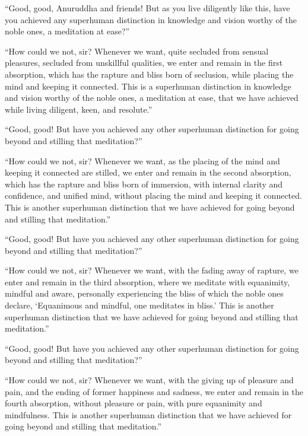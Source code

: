 \documentclass[12pt,openany]{book}%
\begin{document}
“Good, good, Anuruddha and friends! But as you live diligently like this, have you achieved any superhuman distinction in knowledge and vision worthy of the noble ones, a meditation at ease?” 

“How could we not, sir? Whenever we want, quite secluded from sensual pleasures, secluded from unskillful qualities, we enter and remain in the first absorption, which has the rapture and bliss born of seclusion, while placing the mind and keeping it connected. This is a superhuman distinction in knowledge and vision worthy of the noble ones, a meditation at ease, that we have achieved while living diligent, keen, and resolute.” 

“Good, good! But have you achieved any other superhuman distinction for going beyond and stilling that meditation?” 

“How could we not, sir? Whenever we want, as the placing of the mind and keeping it connected are stilled, we enter and remain in the second absorption, which has the rapture and bliss born of immersion, with internal clarity and confidence, and unified mind, without placing the mind and keeping it connected. This is another superhuman distinction that we have achieved for going beyond and stilling that meditation.” 

“Good, good! But have you achieved any other superhuman distinction for going beyond and stilling that meditation?” 

“How could we not, sir? Whenever we want, with the fading away of rapture, we enter and remain in the third absorption, where we meditate with equanimity, mindful and aware, personally experiencing the bliss of which the noble ones declare, ‘Equanimous and mindful, one meditates in bliss.’ This is another superhuman distinction that we have achieved for going beyond and stilling that meditation.” 

“Good, good! But have you achieved any other superhuman distinction for going beyond and stilling that meditation?” 

“How could we not, sir? Whenever we want, with the giving up of pleasure and pain, and the ending of former happiness and sadness, we enter and remain in the fourth absorption, without pleasure or pain, with pure equanimity and mindfulness. This is another superhuman distinction that we have achieved for going beyond and stilling that meditation.” 
\end{document}
